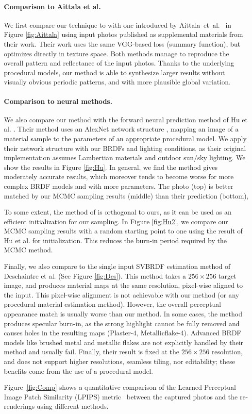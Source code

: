 

\paragraph*{Comparison to Aittala et al.}
We first compare our technique to with one introduced by Aittala~et~al.~\cite{Aittala2016} in Figure \ref{fig:Aittala} using input photos published as supplemental materials from their work.
Their work uses the same VGG-based loss (summary function), but optimizes directly in texture space. Both methods manage to reproduce the overall pattern and reflectance of the input photos.
Thanks to the underlying procedural models, our method is able to synthesize larger results without visually obvious periodic patterns, and with more plausible global variation.





\paragraph*{Comparison to neural methods.}
We also compare our method with the forward neural prediction method of Hu et al. \cite{Hu2019}. Their method uses an AlexNet network structure \cite{krizhevsky2012imagenet}, mapping an image of a material sample to the parameters of an appropriate procedural model. We apply their network structure with our BRDFs and lighting conditions, as their original implementation assumes Lambertian materials and outdoor sun/sky lighting. We show the results in Figure \ref{fig:Hu}. In general, we find the method gives moderately accurate results, which moreover tends to become worse for more complex BRDF models and with more parameters. The photo (top) is better matched by our MCMC sampling results (middle) than their prediction (bottom),

To some extent, the method of \cite{Hu2019} is orthogonal to ours, as it can be used as an efficient initialization for our sampling. In Figure \ref{fig:Hu2}, we compare our MCMC sampling results with a random starting point to one using the result of Hu et al. for initialization. This reduces the burn-in period required by the MCMC method.

Finally, we also compare to the single input SVBRDF estimation method of Deschaintre et al. \cite{Deschaintre2018} (See Figure \ref{fig:Des}). This method takes a $256 \times 256$ target image, and produces material maps at the same resolution, pixel-wise aligned to the input. This pixel-wise alignment is not achievable with our method (or any procedural material estimation method). However, the overall perceptual appearance match is usually worse than our method. In some cases, the method produces specular burn-in, as the strong highlight cannot be fully removed and causes holes in the resulting maps (Plaster-4, Metallicflake-4). Advanced BRDF models like brushed metal and metallic flakes are not explicitly handled by their method and usually fail. Finally, their result is fixed at the $256 \times 256$ resolution, and does not support higher resolutions, seamless tiling, nor editability; these benefits come from the use of a procedural model.

Figure~\ref{fig:Comp} shows a quantitative comparison of the Learned Perceptual Image Patch Similarity (LPIPS) metric~\cite{zhang2018unreasonable} between the captured photos and the re-renderings using different methods.
